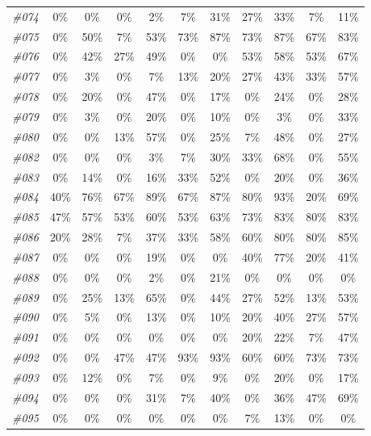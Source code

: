 \begin{table}[t]
\begin{tabular}{ccccccccccc}
      \textit{\#074} & 0\% & 0\% & 0\% & 2\% & 7\% & 31\% & 27\% & 33\% & 7\% & 11\% \\
      \textit{\#075} & 0\% & 50\% & 7\% & 53\% & 73\% & 87\% & 73\% & 87\% & 67\% & 83\% \\
      \textit{\#076} & 0\% & 42\% & 27\% & 49\% & 0\% & 0\% & 53\% & 58\% & 53\% & 67\% \\
      \textit{\#077} & 0\% & 3\% & 0\% & 7\% & 13\% & 20\% & 27\% & 43\% & 33\% & 57\% \\
      \textit{\#078} & 0\% & 20\% & 0\% & 47\% & 0\% & 17\% & 0\% & 24\% & 0\% & 28\% \\
      \textit{\#079} & 0\% & 3\% & 0\% & 20\% & 0\% & 10\% & 0\% & 3\% & 0\% & 33\% \\
      \textit{\#080} & 0\% & 0\% & 13\% & 57\% & 0\% & 25\% & 7\% & 48\% & 0\% & 27\% \\
      \textit{\#082} & 0\% & 0\% & 0\% & 3\% & 7\% & 30\% & 33\% & 68\% & 0\% & 55\% \\
      \textit{\#083} & 0\% & 14\% & 0\% & 16\% & 33\% & 52\% & 0\% & 20\% & 0\% & 36\% \\
      \textit{\#084} & 40\% & 76\% & 67\% & 89\% & 67\% & 87\% & 80\% & 93\% & 20\% & 69\% \\
      \textit{\#085} & 47\% & 57\% & 53\% & 60\% & 53\% & 63\% & 73\% & 83\% & 80\% & 83\% \\
      \textit{\#086} & 20\% & 28\% & 7\% & 37\% & 33\% & 58\% & 60\% & 80\% & 80\% & 85\% \\
      \textit{\#087} & 0\% & 0\% & 0\% & 19\% & 0\% & 0\% & 40\% & 77\% & 20\% & 41\% \\
      \textit{\#088} & 0\% & 0\% & 0\% & 2\% & 0\% & 21\% & 0\% & 0\% & 0\% & 0\% \\
      \textit{\#089} & 0\% & 25\% & 13\% & 65\% & 0\% & 44\% & 27\% & 52\% & 13\% & 53\% \\
      \textit{\#090} & 0\% & 5\% & 0\% & 13\% & 0\% & 10\% & 20\% & 40\% & 27\% & 57\% \\
      \textit{\#091} & 0\% & 0\% & 0\% & 0\% & 0\% & 0\% & 20\% & 22\% & 7\% & 47\% \\
      \textit{\#092} & 0\% & 0\% & 47\% & 47\% & 93\% & 93\% & 60\% & 60\% & 73\% & 73\% \\
      \textit{\#093} & 0\% & 12\% & 0\% & 7\% & 0\% & 9\% & 0\% & 20\% & 0\% & 17\% \\
      \textit{\#094} & 0\% & 0\% & 0\% & 31\% & 7\% & 40\% & 0\% & 36\% & 47\% & 69\% \\
      \textit{\#095} & 0\% & 0\% & 0\% & 0\% & 0\% & 0\% & 7\% & 13\% & 0\% & 0\% \\

\end{tabular}
\end{table}
